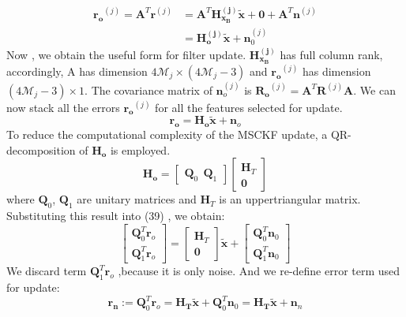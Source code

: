 \documentclass[a4paper, 10pt, conference]{ieeeconf}      %
\begin{document}
\begin{equation}
\begin{split}
\bm {r_o}^{(j)} = \bm A^T\bm {r}^{(j)} & =\bm A^T \bm{H_{x_{B}}^{(j)}}{\tilde {\bm x}}+\bm 0+ \bm A^T{\bm n^{(j)}} \\
& = \bm{H_{o}^{(j)}}{\tilde {\bm x}} + {\bm n_0^{(j)}}
\end{split}
\end{equation}
Now , we obtain the useful form for filter update. 
 $ \bm{H_{x_{B}}^{(j)}} $ has full column rank, accordingly, A has dimension $  4 \mathcal M_j \times
(4 \mathcal M_j-3)  $ and  $ \bm {r_o}^{(j)}  $ has dimension $ (4 \mathcal M_j-3) \times 1 $. The
covariance matrix of $ {\bm n_o^{(j)}} $ is  $ \bm {R_o}^{(j)}  = \bm A^T{\bm R^{(j)}}\bm A $.
We can now stack all the errors $ \bm {r_o}^{(j)}  $ for all the features selected for update.
\begin{equation}
\bm {r_o}= \bm{H_o}{\tilde {\bm x}} + {\bm n_o}
\end{equation}
To reduce the
computational complexity of the MSCKF update, a QR-decomposition of $ \bm{H_o} $ is employed.
\begin{equation}
\bm {H_o}= \left[\begin{matrix} \bm Q_0 \ \ \bm Q_1\end{matrix} \right] \left[\begin{matrix} \bm H_T \\ \bm 0\end{matrix} \right] 
\end{equation}
where $ \bm Q_0 $, $ \bm Q_1 $ are unitary matrices and $ \bm H_T $ is an uppertriangular matrix. Substituting this result into (39) , we obtain:
\begin{equation}
\left[\begin{matrix} \bm Q_0^T \bm r_o \\ \bm Q_1^T\bm r_o\end{matrix} \right]=  \left[\begin{matrix} \bm H_T \\ \bm 0\end{matrix} \right] {\tilde {\bm x}} + \left[\begin{matrix} \bm Q_0^T \bm n_0 \\ \bm Q_1^T\bm n_0\end{matrix} \right] 
\end{equation}
We discard term $ \bm Q_1^T\bm r_o $ ,because it is only noise. And we re-define error term used for update:
\begin{equation}
\bm {r_n}:=\bm Q_0^T \bm r_o =\bm{H_T}{\tilde {\bm x}} + \bm Q_0^T \bm n_0 =\bm{H_T}{\tilde {\bm x}} + \bm n_n
\end{equation}
\end{document}

